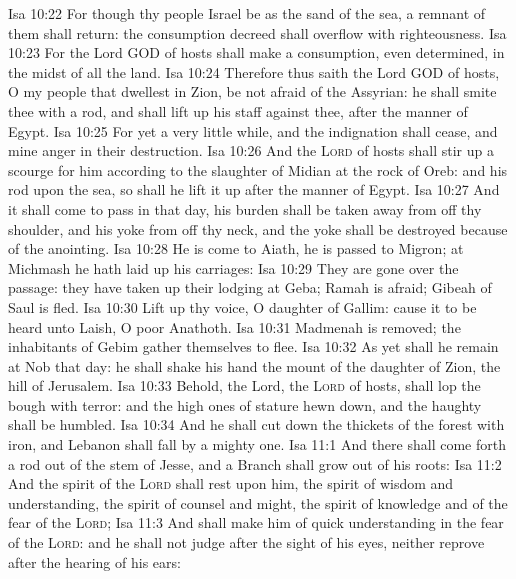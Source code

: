\vs Isa 10:22 For though thy people Israel be as the sand of the sea,  a remnant of them shall return: the consumption decreed shall overflow with righteousness.
\vs Isa 10:23 For the Lord GOD of hosts shall make a consumption, even determined, in the midst of all the land.
\vs Isa 10:24 Therefore thus saith the Lord GOD of hosts, O my people that dwellest in Zion, be not afraid of the Assyrian: he shall smite thee with a rod, and shall lift up his staff against thee, after the manner of Egypt.
\vs Isa 10:25 For yet a very little while, and the indignation shall cease, and mine anger in their destruction.
\vs Isa 10:26 And the \textsc{Lord} of hosts shall stir up a scourge for him according to the slaughter of Midian at the rock of Oreb: and  his rod  upon the sea, so shall he lift it up after the manner of Egypt.
\vs Isa 10:27 And it shall come to pass in that day,  his burden shall be taken away from off thy shoulder, and his yoke from off thy neck, and the yoke shall be destroyed because of the anointing.
\vs Isa 10:28 He is come to Aiath, he is passed to Migron; at Michmash he hath laid up his carriages:
\vs Isa 10:29 They are gone over the passage: they have taken up their lodging at Geba; Ramah is afraid; Gibeah of Saul is fled.
\vs Isa 10:30 Lift up thy voice, O daughter of Gallim: cause it to be heard unto Laish, O poor Anathoth.
\vs Isa 10:31 Madmenah is removed; the inhabitants of Gebim gather themselves to flee.
\vs Isa 10:32 As yet shall he remain at Nob that day: he shall shake his hand  the mount of the daughter of Zion, the hill of Jerusalem.
\vs Isa 10:33 Behold, the Lord, the \textsc{Lord} of hosts, shall lop the bough with terror: and the high ones of stature  hewn down, and the haughty shall be humbled.
\vs Isa 10:34 And he shall cut down the thickets of the forest with iron, and Lebanon shall fall by a mighty one.
\vs Isa 11:1 And there shall come forth a rod out of the stem of Jesse, and a Branch shall grow out of his roots:
\vs Isa 11:2 And the spirit of the \textsc{Lord} shall rest upon him, the spirit of wisdom and understanding, the spirit of counsel and might, the spirit of knowledge and of the fear of the \textsc{Lord};
\vs Isa 11:3 And shall make him of quick understanding in the fear of the \textsc{Lord}: and he shall not judge after the sight of his eyes, neither reprove after the hearing of his ears:
